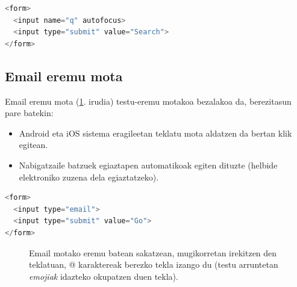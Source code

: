  \begin{lstlisting}[language=JavaScript,numbers=none]
 <form>
  <input name="q" autofocus>
  <input type="submit" value="Search">
</form>
 \end{lstlisting}
 
 \subsection{Email eremu mota}
 
 Email eremu mota (\ref{fig:emailmota}. irudia) testu-eremu motakoa bezalakoa da, berezitasun pare batekin: 
 
 \begin{itemize}
     \item Android eta iOS sistema eragileetan teklatu mota aldatzen da bertan klik egitean.
     \item Nabigatzaile batzuek egiaztapen automatikoak egiten dituzte (helbide elektroniko zuzena dela egiaztatzeko).
 \end{itemize}

 \begin{lstlisting}[language=JavaScript,numbers=none]
 <form>
  <input type="email">
  <input type="submit" value="Go">
</form>
\end{lstlisting}
 
 \begin{figure}[ht]
	\centering
{}
\caption{Email motako eremu batean sakatzean, mugikorretan irekitzen den teklatuan, @ karaktereak berezko tekla izango du (testu arruntetan \textit{emojiak} idazteko okupatzen duen tekla).}
\label{fig:emailmota}
\end{figure}

